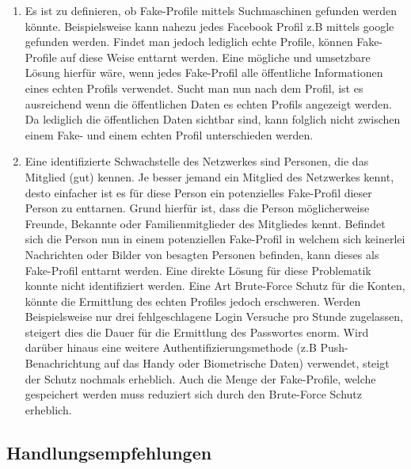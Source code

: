 \documentclass{sigchi}
\begin{document}
\begin{enumerate}
	\item Es ist zu definieren, ob Fake-Profile mittels Suchmaschinen gefunden werden könnte. Beispielsweise kann nahezu jedes Facebook Profil z.B mittels google gefunden werden. Findet man jedoch lediglich echte Profile, können Fake-Profile auf diese Weise enttarnt werden. Eine mögliche und umsetzbare Lösung hierfür wäre, wenn jedes Fake-Profil alle öffentliche Informationen eines echten Profils verwendet. Sucht man nun nach dem Profil, ist es ausreichend wenn die öffentlichen Daten es echten Profils angezeigt werden. Da lediglich die öffentlichen Daten sichtbar sind, kann folglich nicht zwischen einem Fake- und einem echten Profil unterschieden werden.
	\item Eine identifizierte Schwachstelle des Netzwerkes sind Personen, die das Mitglied (gut) kennen. Je besser jemand ein Mitglied des Netzwerkes kennt, desto einfacher ist es für diese Person ein potenzielles Fake-Profil dieser Person zu enttarnen. Grund hierfür ist, dass die Person möglicherweise Freunde, Bekannte oder Familienmitglieder des Mitgliedes kennt. Befindet sich die Person nun in einem potenziellen Fake-Profil in welchem sich keinerlei Nachrichten oder Bilder von besagten Personen befinden, kann dieses als Fake-Profil enttarnt werden. Eine direkte Lösung für diese Problematik konnte nicht identifiziert werden. Eine Art Brute-Force Schutz für die Konten, könnte die Ermittlung des echten Profiles jedoch erschweren. Werden Beispielsweise nur drei fehlgeschlagene Login Versuche pro Stunde zugelassen, steigert dies die Dauer für die Ermittlung des Passwortes enorm. Wird darüber hinaus eine weitere Authentifizierungsmethode (z.B Push-Benachrichtung auf das Handy oder Biometrische Daten) verwendet, steigt der Schutz nochmals erheblich. Auch die Menge der Fake-Profile, welche gespeichert werden muss reduziert sich durch den Brute-Force Schutz erheblich.
\end{enumerate}

\subsection{Handlungsempfehlungen}
\label{Handlungsempfehlung}
\end{document}
